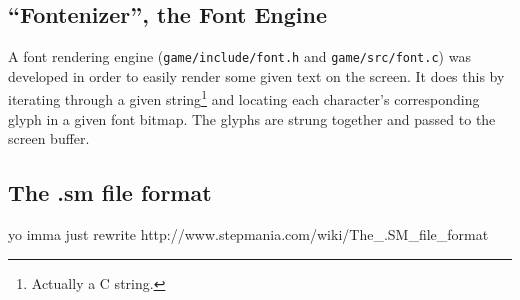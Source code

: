 \subsection{``Fontenizer'', the Font Engine}
	A font rendering engine (\texttt{game/include/font.h} and \texttt{game/src/font.c}) was developed in order to easily render some given text on the screen.
	It does this by iterating through a given string\footnote{Actually a C string.} and locating each character's corresponding glyph in a given font bitmap.
	The glyphs are strung together and passed to the screen buffer.

\subsection{The .sm file format}
	yo imma just rewrite http://www.stepmania.com/wiki/The_.SM_file_format